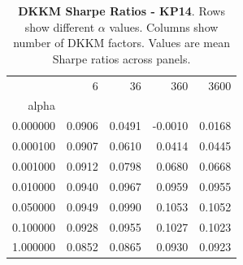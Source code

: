 \begin{table}[h]
\centering
\begin{tabular}{rrrrr}
\toprule
 & 6 & 36 & 360 & 3600 \\
alpha &  &  &  &  \\
\midrule
0.000000 & 0.0906 & 0.0491 & -0.0010 & 0.0168 \\
0.000100 & 0.0907 & 0.0610 & 0.0414 & 0.0445 \\
0.001000 & 0.0912 & 0.0798 & 0.0680 & 0.0668 \\
0.010000 & 0.0940 & 0.0967 & 0.0959 & 0.0955 \\
0.050000 & 0.0949 & 0.0990 & 0.1053 & 0.1052 \\
0.100000 & 0.0928 & 0.0955 & 0.1027 & 0.1023 \\
1.000000 & 0.0852 & 0.0865 & 0.0930 & 0.0923 \\
\bottomrule
\end{tabular}
\caption{\textbf{DKKM Sharpe Ratios - KP14}.
    Rows show different $\alpha$ values. Columns show number of DKKM factors.
    Values are mean Sharpe ratios across panels.}
\label{tab:dkkm_sharpe_kp14}

\end{table}